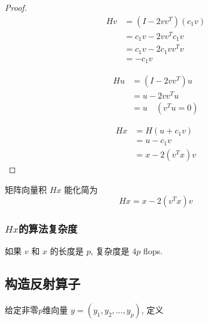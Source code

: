 \begin{proof}
    \begin{equation}\begin{aligned}
        Hv &= (I-2 v v^{T}) (c_1 v) \\
        &= c_1 v - 2 v v^T c_1 v \\
        & = c_1 v - 2 c_1 v v^T v \\
        & = -c_1 v
    \end{aligned}\end{equation}

    \begin{equation}\begin{aligned}
        Hu &= (I - 2 v v^T) u \\
        &= u - 2 v v^T u \\
        & = u \quad (v^T u = 0) 
    \end{aligned}\end{equation}

    \begin{equation}\begin{aligned}
        Hx &= H(u + c_1v) \\
        &= u - c_1 v \\
        &= x - 2(v^Tx)v
    \end{aligned}\end{equation}
\end{proof}

\begin{corollary}
    矩阵向量积 $ H x $ 能化简为
\begin{equation}
H x=x-2\left(v^{T} x\right) v
\end{equation}
\end{corollary}


\subsubsection{$Hx$的算法复杂度}
    \label{complexity:Hx}

    如果 $ v $ 和 $ x $ 的长度是 $ p $, 复杂度是 $ 4 p $ flops.


\subsection{构造反射算子}

给定非零$p$维向量 $ y=\left(y_{1}, y_{2}, \ldots, y_{p}\right) $, 定义

